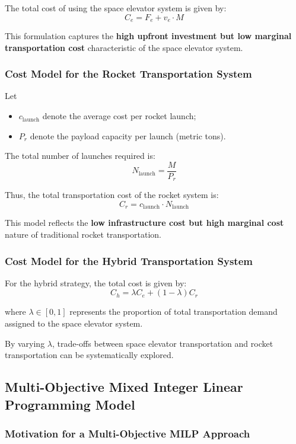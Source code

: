 \documentclass[12pt]{mcmthesis}
\begin{document}
The total cost of using the space elevator system is given by:
\[
    C_e = F_e + v_e \cdot M
\]

This formulation captures the \textbf{high upfront investment but low marginal transportation cost} characteristic of the space elevator system.

\subsubsection{Cost Model for the Rocket Transportation System}

Let
\begin{itemize}
    \item $c_{\text{launch}}$ denote the average cost per rocket launch;
    \item $P_r$ denote the payload capacity per launch (metric tons).
\end{itemize}

The total number of launches required is:
\[
    N_{\text{launch}} = \frac{M}{P_r}
\]

Thus, the total transportation cost of the rocket system is:
\[
    C_r = c_{\text{launch}} \cdot N_{\text{launch}}
\]

This model reflects the \textbf{low infrastructure cost but high marginal cost} nature of traditional rocket transportation.

\subsubsection{Cost Model for the Hybrid Transportation System}

For the hybrid strategy, the total cost is given by:
\[
    C_h = \lambda C_e + (1 - \lambda) C_r
\]

where $\lambda \in [0,1]$ represents the proportion of total transportation demand assigned to the space elevator system.

By varying $\lambda$, trade-offs between space elevator transportation and rocket transportation can be systematically explored.

\subsection{Multi-Objective Mixed Integer Linear Programming Model}

\subsubsection{Motivation for a Multi-Objective MILP Approach}
\end{document}
